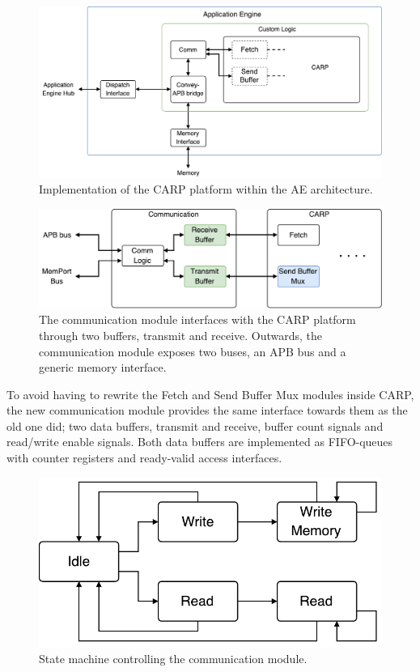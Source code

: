 \begin{figure}[ht]
  \centering
  \includegraphics[width=\linewidth]{fig/convey-io-carp-overview}
  \caption{Implementation of the CARP platform within the AE architecture.}
  \label{fig:convey-io-carp-overivew}
\end{figure}

\begin{figure}[ht]
  \centering
  \includegraphics[width=0.8\linewidth]{fig/comm-io}
  \caption{
    The communication module interfaces with the CARP platform through two
    buffers, transmit and receive. Outwards, the communication module exposes two
    buses, an APB bus and a generic memory interface.
  }
  \label{fig:comm-io}
\end{figure}

To avoid having to rewrite the Fetch and Send Buffer Mux modules inside CARP,
the new communication module provides the same interface towards them as the old
one did; two data buffers, transmit and receive, buffer count signals and
read/write enable signals. Both data buffers are implemented as FIFO-queues with
counter registers and ready-valid access interfaces.

\begin{figure}[ht]
  \centering
  \includegraphics[width=0.5\linewidth]{fig/comm-fsm}
  \caption{State machine controlling the communication module.}
  \label{fig:comm-fsm}
\end{figure}


